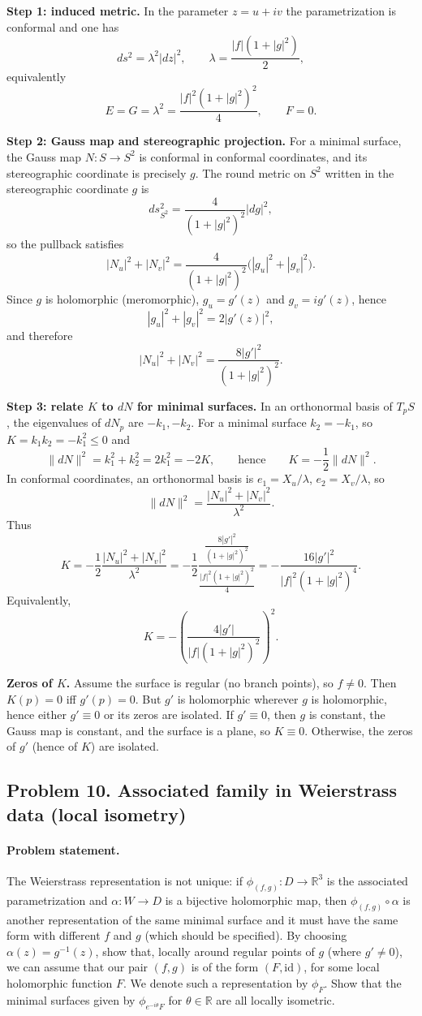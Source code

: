 \documentclass[12pt,a4paper]{article}
\theoremstyle{plain}
\theoremstyle{definition}      %
\begin{document}
	\medskip
	\textbf{Step 1: induced metric.}
	In the parameter $z=u+iv$ the parametrization is conformal and one has
	\[
	ds^2=\lambda^2|dz|^2,\qquad 
	\lambda=\frac{|f|(1+|g|^2)}{2},
	\]
	equivalently
	\[
	E=G=\lambda^2=\frac{|f|^2(1+|g|^2)^2}{4},\qquad F=0.
	\]
	
	\medskip
	\textbf{Step 2: Gauss map and stereographic projection.}
	For a minimal surface, the Gauss map $N:S\to S^2$ is conformal in conformal coordinates, and its stereographic
	coordinate is precisely $g$. The round metric on $S^2$ written in the stereographic coordinate $g$ is
	\[
	ds^2_{S^2}=\frac{4}{(1+|g|^2)^2}|dg|^2,
	\]
	so the pullback satisfies
	\[
	|N_u|^2+|N_v|^2=\frac{4}{(1+|g|^2)^2}\bigl(|g_u|^2+|g_v|^2\bigr).
	\]
	Since $g$ is holomorphic (meromorphic), $g_u=g'(z)$ and $g_v=i g'(z)$, hence
	\[
	|g_u|^2+|g_v|^2=2|g'(z)|^2,
	\]
	and therefore
	\[
	|N_u|^2+|N_v|^2=\frac{8|g'|^2}{(1+|g|^2)^2}.
	\]
	
	\medskip
	\textbf{Step 3: relate $K$ to $dN$ for minimal surfaces.}
	In an orthonormal basis of $T_pS$, the eigenvalues of $dN_p$ are $-k_1,-k_2$.
	For a minimal surface $k_2=-k_1$, so $K=k_1k_2=-k_1^2\le 0$ and
	\[
	\|dN\|^2=k_1^2+k_2^2=2k_1^2=-2K,
	\qquad\text{hence}\qquad
	K=-\frac12\|dN\|^2.
	\]
	In conformal coordinates, an orthonormal basis is $e_1=X_u/\lambda$, $e_2=X_v/\lambda$, so
	\[
	\|dN\|^2=\frac{|N_u|^2+|N_v|^2}{\lambda^2}.
	\]
	Thus
	\[
	K=-\frac12\frac{|N_u|^2+|N_v|^2}{\lambda^2}
	=-\frac12\frac{\frac{8|g'|^2}{(1+|g|^2)^2}}{\frac{|f|^2(1+|g|^2)^2}{4}}
	=-\frac{16|g'|^2}{|f|^2(1+|g|^2)^4}.
	\]
	Equivalently,
	\[
	K=-\left(\frac{4|g'|}{|f|(1+|g|^2)^2}\right)^2.
	\]
	
	\medskip
	\textbf{Zeros of $K$.}
	Assume the surface is regular (no branch points), so $f\neq 0$.
	Then $K(p)=0$ iff $g'(p)=0$.
	But $g'$ is holomorphic wherever $g$ is holomorphic, hence either $g'\equiv 0$ or its zeros are isolated.
	If $g'\equiv 0$, then $g$ is constant, the Gauss map is constant, and the surface is a plane, so $K\equiv 0$.
	Otherwise, the zeros of $g'$ (hence of $K$) are isolated.
	
\subsection*{Problem 10. Associated family in Weierstrass data (local isometry)}

\paragraph{\textbf{Problem statement.}}
The Weierstrass representation is not unique: if $\phi_{(f,g)}:D\to\mathbb{R}^3$ is the associated parametrization and
$\alpha:W\to D$ is a bijective holomorphic map, then $\phi_{(f,g)}\circ\alpha$ is another representation of the same minimal
surface and it must have the same form with different $f$ and $g$ (which should be specified).
By choosing $\alpha(z)=g^{-1}(z)$, show that, locally around regular points of $g$ (where $g'\neq 0$), we can assume
that our pair $(f,g)$ is of the form $(F,\mathrm{id})$, for some local holomorphic function $F$. We denote such a
representation by $\phi_F$. Show that the minimal surfaces given by $\phi_{e^{-i\theta}F}$ for $\theta\in\mathbb{R}$
are all locally isometric.
\end{document}
